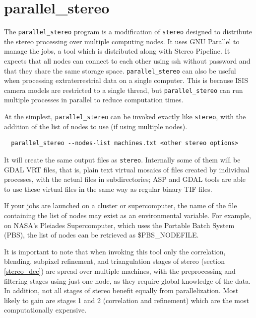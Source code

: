 \section{parallel\_stereo}
\label{parallel}

The \texttt{parallel\_stereo} program is a modification of
\texttt{stereo} designed to distribute the stereo processing over
multiple computing nodes. It uses GNU Parallel to manage the jobs, a
tool which is distributed along with Stereo Pipeline. It expects that
all nodes can connect to each other using ssh without password and that
they share the same storage space. \texttt{parallel\_stereo} can also be
useful when processing extraterrestrial data on a single computer.  This
is because ISIS camera models are restricted to a single thread, but
\texttt{parallel\_stereo} can run multiple processes in parallel to
reduce computation times.

At the simplest, \texttt{parallel\_stereo} can be invoked exactly like \texttt{stereo},
with the addition of the list of nodes to use (if using multiple nodes).

\begin{verbatim}
  parallel_stereo --nodes-list machines.txt <other stereo options>
\end{verbatim}

It will create the same output files as \texttt{stereo}. Internally
some of them will be GDAL VRT files, that is, plain text virtual mosaics 
of files created by individual processes, with the actual files in subdirectories;
ASP and GDAL tools are able to use these
virtual files in the same way as regular binary TIF files.

If your jobs are launched on a cluster or supercomputer, the name of the
file containing the list of nodes may exist as an environmental
variable. For example, on NASA's Pleiades Supercomputer, which uses the
Portable Batch System (PBS), the list of nodes can be retrieved as
\$PBS\_NODEFILE.

It is important to note that when invoking this tool only the correlation, 
blending, subpixel refinement, and triangulation stages of stereo 
(section \ref{stereo_dec}) are spread over multiple machines, with 
the preprocessing and filtering stages using just one node, as they require
global knowledge of the data. In addition, not all stages of stereo
benefit equally from parallelization. Most likely to gain are stages 1
and 2 (correlation and refinement) which are the most computationally
expensive.

